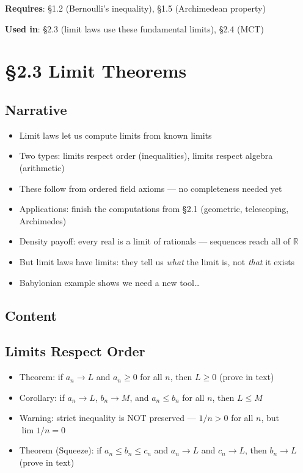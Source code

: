 \documentclass[
  10pt,
  letterpaper,
]{scrbook}
\providecommand{\tightlist}{%
  \setlength{\itemsep}{0pt}\setlength{\parskip}{0pt}}
\newcommand{\RR}{\mathbb{R}}
\begin{document}
\textbf{Requires}: §1.2 (Bernoulli's inequality), §1.5 (Archimedean
property)

\textbf{Used in}: §2.3 (limit laws use these fundamental limits), §2.4
(MCT)

\section{§2.3 Limit Theorems}\label{limit-theorems}

\subsection{Narrative}\label{narrative-7}

\begin{itemize}
\tightlist
\item
  Limit laws let us compute limits from known limits
\item
  Two types: limits respect order (inequalities), limits respect algebra
  (arithmetic)
\item
  These follow from ordered field axioms --- no completeness needed yet
\item
  Applications: finish the computations from §2.1 (geometric,
  telescoping, Archimedes)
\item
  Density payoff: every real is a limit of rationals --- sequences reach
  all of \(\RR\)
\item
  But limit laws have limits: they tell us \emph{what} the limit is, not
  \emph{that} it exists
\item
  Babylonian example shows we need a new tool\ldots{}
\end{itemize}

\subsection{Content}\label{content-7}

\subsection{Limits Respect Order}\label{limits-respect-order}

\begin{itemize}
\tightlist
\item
  Theorem: if \(a_n \to L\) and \(a_n \geq 0\) for all \(n\), then
  \(L \geq 0\) (prove in text)
\item
  Corollary: if \(a_n \to L\), \(b_n \to M\), and \(a_n \leq b_n\) for
  all \(n\), then \(L \leq M\)
\item
  Warning: strict inequality is NOT preserved --- \(1/n > 0\) for all
  \(n\), but \(\lim 1/n = 0\)
\item
  Theorem (Squeeze): if \(a_n \leq b_n \leq c_n\) and \(a_n \to L\) and
  \(c_n \to L\), then \(b_n \to L\) (prove in text)
\end{itemize}
\end{document}
